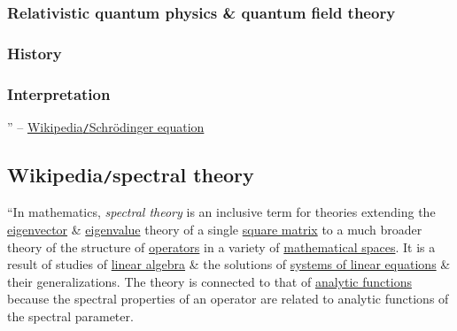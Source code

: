 \documentclass{article}
\begin{document}
\subsubsection{Relativistic quantum physics \& quantum field theory}

\subsubsection{History}

\subsubsection{Interpretation}

'' -- \href{https://en.wikipedia.org/wiki/Schr%C3%B6dinger_equation}{Wikipedia{\tt/}Schrödinger equation}


\subsection{Wikipedia{\tt/}spectral theory}
``In mathematics, {\it spectral theory} is an inclusive term for theories extending the \href{https://en.wikipedia.org/wiki/Eigenvector}{eigenvector} \& \href{https://en.wikipedia.org/wiki/Eigenvalue}{eigenvalue} theory of a single \href{https://en.wikipedia.org/wiki/Square_matrix}{square matrix} to a much broader theory of the structure of \href{https://en.wikipedia.org/wiki/Operator_(mathematics)}{operators} in a variety of \href{https://en.wikipedia.org/wiki/Mathematical_space}{mathematical spaces}. It is a result of studies of \href{https://en.wikipedia.org/wiki/Linear_algebra}{linear algebra} \& the solutions of \href{https://en.wikipedia.org/wiki/System_of_linear_equations}{systems of linear equations} \& their generalizations. The theory is connected to that of \href{https://en.wikipedia.org/wiki/Analytic_functions}{analytic functions} because the spectral properties of an operator are related to analytic functions of the spectral parameter.
\end{document}
